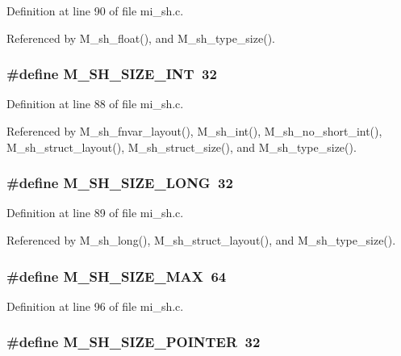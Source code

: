 Definition at line 90 of file mi\_\-sh.c.

Referenced by M\_\-sh\_\-float(), and M\_\-sh\_\-type\_\-size().
\subsubsection{\setlength{\rightskip}{0pt plus 5cm}\#define M\_\-SH\_\-SIZE\_\-INT~32}\label{mi__sh_8c_9971ae92edff3a015f04b64d0a54a377}




Definition at line 88 of file mi\_\-sh.c.

Referenced by M\_\-sh\_\-fnvar\_\-layout(), M\_\-sh\_\-int(), M\_\-sh\_\-no\_\-short\_\-int(), M\_\-sh\_\-struct\_\-layout(), M\_\-sh\_\-struct\_\-size(), and M\_\-sh\_\-type\_\-size().
\subsubsection{\setlength{\rightskip}{0pt plus 5cm}\#define M\_\-SH\_\-SIZE\_\-LONG~32}\label{mi__sh_8c_bc3a2d65048ca6800772f7074c9f6b5c}




Definition at line 89 of file mi\_\-sh.c.

Referenced by M\_\-sh\_\-long(), M\_\-sh\_\-struct\_\-layout(), and M\_\-sh\_\-type\_\-size().
\subsubsection{\setlength{\rightskip}{0pt plus 5cm}\#define M\_\-SH\_\-SIZE\_\-MAX~64}\label{mi__sh_8c_ad57ce4440ec34fadc908fc3438ff250}




Definition at line 96 of file mi\_\-sh.c.
\subsubsection{\setlength{\rightskip}{0pt plus 5cm}\#define M\_\-SH\_\-SIZE\_\-POINTER~32}\label{mi__sh_8c_3341f7851672d1e42595feb2c758be65}




